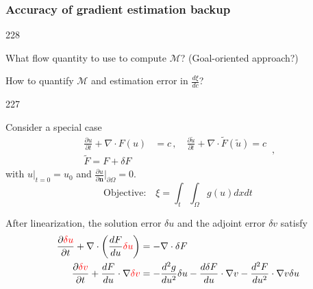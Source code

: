 \documentclass{beamer}
\newcommand{\barrow}{\item[\color{darkred}\ding{228}]}
\newcommand{\carrow}{\item[\color{darkred}\ding{227}]}
\begin{document}

\begin{frame}
    \frametitle{Accuracy of gradient estimation \hfill \scriptsize{backup}}\small
    \begin{dinglist}{228}
        \barrow 
        What flow quantity to use to compute $\mathcal{M}$? (Goal-oriented approach?)
        \barrow 
        How to quantify $\mathcal{M}$ and estimation error in $\frac{d\xi}{dc}$?
    \begin{dinglist}{227}
        \carrow Consider a special case
        \begin{equation*}\begin{split}
            \frac{\partial u}{\partial t} + \nabla \cdot F(u) &= c\,,\quad
            \frac{\partial \tilde{u}}{\partial t} + \nabla\cdot\tilde{F}(\tilde{u}) = c
            \\
            \tilde{F} = F + \delta F
        \end{split}\,,\end{equation*}
        with $u\big|_{t=0} = u_0$ and $\frac{\partial u}{\partial \mathbf{n}}\big|_{\partial \Omega} = 0$.
        $$
            \textrm{Objective:} \quad \xi = \int_t\int_\Omega g(u) dxdt
        $$
        \carrow 
        After linearization, the solution error $\delta u$ and the adjoint error $\delta v$ satisfy
        \begin{equation*}\begin{split}
            \frac{\partial \textcolor{red}{\delta u}}{\partial t} + \nabla \cdot
            \left( \frac{dF}{du} \textcolor{red}{\delta u}\right) &= - \nabla\cdot
            \delta F\\
            \frac{\partial \textcolor{red}{\delta v}}{\partial t} + \frac{dF}{du} \cdot\nabla\textcolor{red}{\delta v}
            &= -\frac{d^2 g}{du^2}\delta u - \frac{d\delta F}{du} \cdot \nabla v-\frac{d^2 F}{du^2}
            \cdot \nabla v
            \delta u
        \end{split}\end{equation*}
    \end{dinglist}
    \end{dinglist}
\end{frame}
\end{document}
